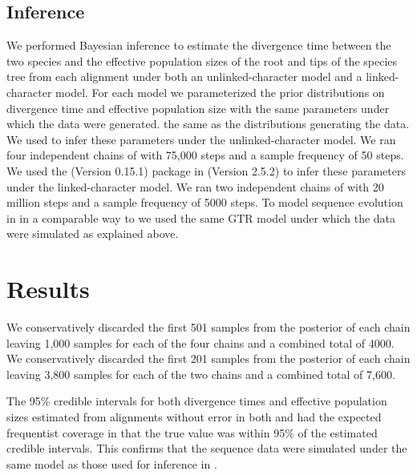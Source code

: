 \subsection{Inference}
We performed Bayesian inference to estimate the divergence time between the two species and the effective 
population sizes of the root and tips of the species tree from each alignment 
under both an unlinked-character model and a linked-character model. For each 
model we parameterized the prior distributions on divergence time and effective
population size with the same parameters under which the data were generated. 
the same as the distributions generating the data.
We used \ecoevolity
\citep[Version 0.3.2; dev branch commit a7e9bf2;][]{Oaks2018ecoevolity}
to infer these parameters under the 
unlinked-character model.
We ran four independent chains of \ecoevolity with 75,000 steps and a sample 
frequency of 50 steps.
We used the \beast (Version 0.15.1) \citep{@ogilvieStarBEAST2BringsFaster2017} 
package in \beastcore (Version 2.5.2) \citep{@bouckaertBEASTSoftwarePlatform2014}
to infer these parameters under the linked-character model. 
We ran two independent chains of \beast with 20 million steps and a 
sample frequency of 5000 steps. 
To model sequence evolution in \beast in a comparable way to \ecoevolity we used 
the same GTR model under which the data were simulated as explained above.


\section{Results}



We conservatively discarded the first 501 samples from the posterior of each 
\ecoevolity chain leaving 1,000 samples for each of the four chains and a combined
total of 4000.
We conservatively discarded the first 201 samples from the posterior of each 
\beast chain leaving 3,800 samples for each of the two chains and a combined
total of 7,600.


The 95\% credible intervals for both divergence times and effective population 
sizes estimated from alignments without error in both \beast and \ecoevolity had 
the expected frequentist coverage in that the true value was within 95\% of the 
estimated credible intervals. This confirms that the sequence data were simulated
under the same model as those used for inference in \beast.


